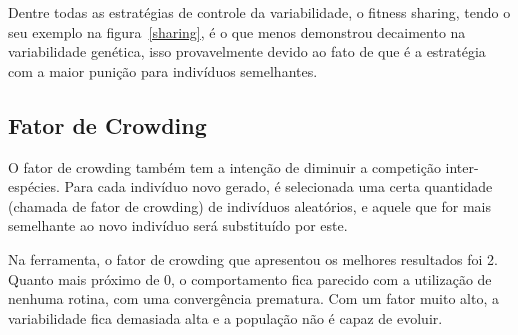 \documentclass[12pt]{article}
\begin{document}
Dentre todas as estratégias de controle da variabilidade, o fitness sharing, tendo o seu 
exemplo na figura~\ref{sharing}, é o que menos demonstrou decaimento na variabilidade 
genética, isso provavelmente devido ao fato de que é a estratégia com a maior punição 
para indivíduos semelhantes.

\subsection{Fator de Crowding}

O fator de crowding também tem a intenção de diminuir a competição inter-espécies. Para 
cada indivíduo novo gerado, é selecionada uma certa quantidade (chamada de fator de 
crowding) de indivíduos aleatórios, e aquele que for mais semelhante ao novo indivíduo 
será substituído por este.

Na ferramenta, o fator de crowding que apresentou os melhores resultados foi 2. Quanto 
mais próximo de 0, o comportamento fica parecido com a utilização de nenhuma rotina, 
com uma convergência prematura. Com um fator muito alto, a variabilidade fica demasiada 
alta e a população não é capaz de evoluir.
\end{document}
